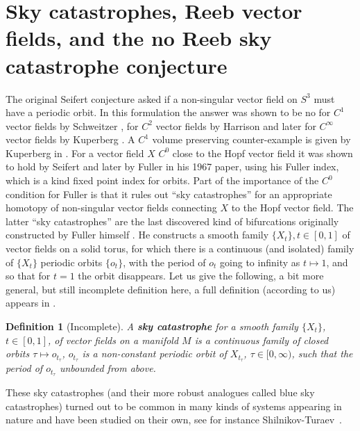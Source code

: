 \documentclass{amsart}
\numberwithin{equation}{section}
\newtheorem{definition}[equation]{Definition}
\theoremstyle{definition}
\theoremstyle{remark}
\begin{document}
\section {Sky catastrophes, Reeb vector fields, and the no Reeb sky catastrophe conjecture}
The original Seifert conjecture  \cite{citeSeifert} asked if a non-singular vector field on $S
^{3} $ must have a periodic orbit. 
In this formulation the answer was shown to
be no for $C
^{1} $ vector fields by
Schweitzer \cite{citeSchweitzerC1Counterexample}, for $C ^{2} $ vector fields by
Harrison \cite{citeHarrison} and later for $C ^{\infty} $ vector fields by Kuperberg \cite{citeKKuperbergSmoothCounterexample}. A $C^1$ volume preserving counter-example is given by Kuperberg in \cite{citeKuperbergvolumepreserving}.
For a vector field $X$ $C^0$ close to the Hopf vector field it was
shown to hold by Seifert and later by Fuller 
\cite{citeFullerIndex} in his 1967 paper, using his Fuller index, which is a kind fixed point index for orbits.
Part of the importance of the  $C
^{0} $ condition for Fuller is
that it rules out ``sky catastrophes'' for an appropriate
homotopy of non-singular vector
fields connecting $X$ to the Hopf vector field. The latter ``sky catastrophes'' 
are the last discovered kind of bifurcations
originally constructed by Fuller himself \cite{citeFullerBlueSky}. 
He constructs a smooth family $\{X _{t} \}, t \in [0,1] $ of vector fields
on a solid torus, 
for which there is a continuous (and isolated) family of $\{X _{t}\} $ periodic orbits
$\{o _{t}\} $,  with the period of $o _{t} $ going
to infinity as $t \mapsto 1$, and so that for $t =1$ the orbit
disappears. Let us give the following, a bit more general, but still incomplete definition here, a full definition (according to us) appears in \cite{citeSavelyevFuller}.
\begin{definition} [Incomplete] 
  A \textbf{\emph{sky catastrophe}} for a smooth family $\{X _{t} \}$, $t \in [0,1]$,
   of vector
   fields on a manifold $M$ is a continuous family of closed orbits $\tau \mapsto o _{t _{\tau} }$, $o _{t _{\tau} } $ is a non-constant periodic orbit of $X _{t _{\tau} } $, $\tau \in [0, \infty)$, such that the period of $o _{t _{\tau} } $ unbounded from above.
\end{definition}
These sky catastrophes (and their more robust analogues called blue sky catastrophes) turned out to be common in many kinds of systems
appearing in nature and have been studied on their own, see for instance
Shilnikov-Turaev~\cite{citeShilnikovTuraevBlueSky}.
\end{document}
